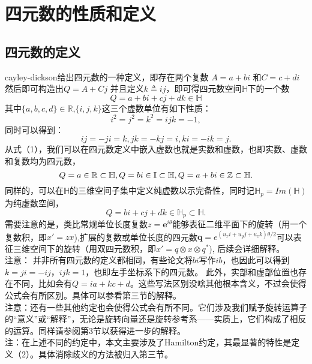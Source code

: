 \documentclass{article}
\begin{document}
    \section{四元数的性质和定义}
    \subsection{四元数的定义}
    cayley-dickson给出四元数的一种定义，即存在两个复数
    $A = a + bi $ 和$C = c+di$然后即可构造出$Q=A+Cj$ 并且定义$k \triangleq ij$，即可得四元数空间$\mathbb{H}$下的一个数
    $$ 
        Q = a+bi+cj+dk\in \mathbb{H} 
    $$
    其中$\{a,b,c,d\}\in \mathbb{R}$,$\{i,j,k\}$这三个虚数单位有如下性质：
    $$ i^2=j^2=k^2=ijk=-1, 
    $$同时可以得到：
    $$ ij=-ji=k, jk=-kj=i, ki=-ik=j. 
    $$从式（1），我们可以在四元数定义中嵌入虚数也就是实数和虚数，也即实数、虚数和复数均为四元数，
    $$ 
        Q =a \in \mathbb{R} \subset \mathbb{H},
       \\Q =bi \in \mathbb{I} \subset \mathbb{H},
       \\Q =a+bi \in \mathbb{Z} \subset \mathbb{H}.
    $$同样的，可以在$\mathbb{H}$的三维空间子集中定义纯虚数以示完备性，同时记$\mathbb{H}_p = Im(\mathbb{H})$为纯虚数空间，
    $$
        Q = bi+cj+dk \in \mathbb{H}_p \subset\mathbb{H}. 
    $$需要注意的是，类比常规单位长度复数$z=\textbf{e}^{i\theta}$能够表征二维平面下的旋转（用一个复数积，即$x{'}=zx$),扩展的复数或单位长度的四元数$\textbf{q}=e^{(u_xi+u_yj+u_zk)\theta/2}$可以表征三维空间下的旋转（用双四元数积，即$x{'}=q\otimes{x}\otimes{q}^{*}$),
    后续会详细解释。
    \\$\textbf{注意：}$ 并非所有四元数的定义都相同，有些论文将$bi$写作$ib$，也因此可以得到$k=ji=-ij，ijk=1$，也即左手坐标系下的四元数。
    此外，实部和虚部位置也存在不同，比如会有$Q=ia+kc+d$。这些写法区别没啥其他根本含义，不过会使得公式会有所区别。具体可以参看第三节的解释。
    \\$\textbf{注意：}$还有一些其他约定也会使得公式会有所不同。它们涉及我们赋予旋转运算子的“意义”或“解释”，无论是旋转向量还是旋转参考系——实质上，它们构成了相反的运算。同样请参阅第3节以获得进一步的解释。
    \\$\textbf{注：}$在上述不同的约定中，本文主要涉及了Hamilton约定，其最显著的特性是定义（2）。具体消除歧义的方法被归入第三节。
\end{document}
